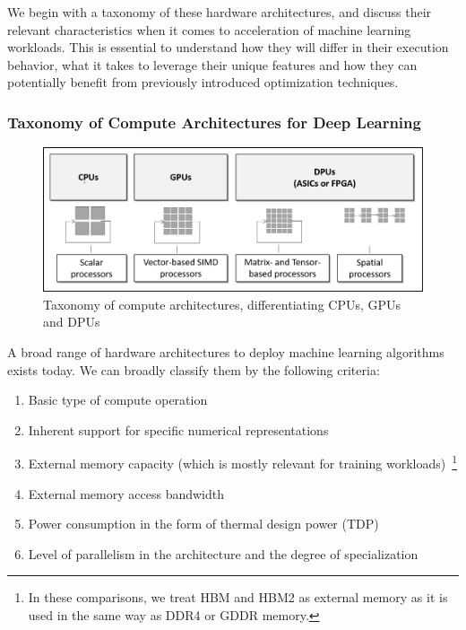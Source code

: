 We begin with a taxonomy of these hardware architectures, and discuss their relevant characteristics when it comes to acceleration of machine learning workloads. 
This is essential to understand how they will differ in their execution behavior, what it takes to leverage their unique features and how they can potentially benefit from previously introduced optimization techniques. 

\subsubsection*{\textbf{Taxonomy of Compute Architectures for Deep Learning}}

\begin{figure}
\centering
\includegraphics[width=0.8\linewidth]{figures/taxonomy.png}
\caption{Taxonomy of compute architectures, differentiating CPUs, GPUs and DPUs}
\label{fig:tax}
\end{figure}

A broad range of hardware architectures to deploy machine learning algorithms exists today.
We can broadly classify them by the following criteria:

\begin{enumerate}[itemsep=-1pt]
\item Basic type of compute operation
\item Inherent support for specific numerical representations
\item External memory capacity (which is mostly relevant for training workloads)~\footnote{In these comparisons, we treat HBM and HBM2 as external memory as it is used in the same way as DDR4 or GDDR memory.}
\item External memory access bandwidth
\item Power consumption in the form of thermal design power (TDP)
\item Level of parallelism in the architecture and the degree of specialization
\end{enumerate}
 
